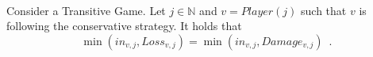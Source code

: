 \begin{lemma} \ \\
  Consider a Transitive Game. Let $j \in \mathbb{N}$ and $v = Player\left(j\right)$ such that $v$ is following the
  conservative strategy. It holds that
  \begin{equation*}
    \min\left(in_{v, j}, Loss_{v, j}\right) = \min\left(in_{v, j}, Damage_{v, j}\right) \enspace.
  \end{equation*}
\end{lemma}
